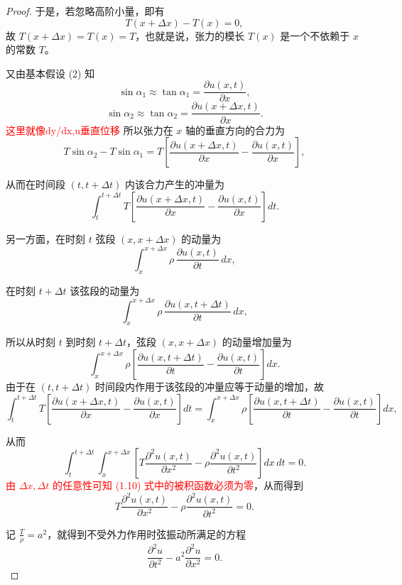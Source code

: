 \begin{proof}
于是，若忽略高阶小量，即有
\begin{equation}
  T(x+\Delta x) - T(x) = 0, \tag{1.5}
\end{equation}
故 $T(x+\Delta x) = T(x) = T$，也就是说，张力的模长 $T(x)$ 是一个不依赖于 $x$ 的常数 $T$。

又由基本假设 (2) 知
\begin{equation}
  \sin \alpha_1 \approx \tan \alpha_1 = \frac{\partial u(x,t)}{\partial x}, \tag{1.6}
\end{equation}
\begin{equation}
  \sin \alpha_2 \approx \tan \alpha_2 = \frac{\partial u(x+\Delta x,t)}{\partial x}. \tag{1.7}
\end{equation}
\textcolor{red}{这里就像dy/dx,u垂直位移}
所以张力在 $x$ 轴的垂直方向的合力为
\[
T \sin \alpha_2 - T \sin \alpha_1 
= T \left[ \frac{\partial u(x+\Delta x,t)}{\partial x} 
          - \frac{\partial u(x,t)}{\partial x} \right],
\]

从而在时间段 $(t,t+\Delta t)$ 内该合力产生的冲量为
\begin{equation}
  \int_t^{t+\Delta t} 
  T \left[ \frac{\partial u(x+\Delta x,t)}{\partial x} 
          - \frac{\partial u(x,t)}{\partial x} \right] dt. 
  \tag{1.8}
\end{equation}

另一方面，在时刻 $t$ 弦段 $(x,x+\Delta x)$ 的动量为
\[
\int_x^{x+\Delta x} \rho \, \frac{\partial u(x,t)}{\partial t} \, dx,
\]

在时刻 $t+\Delta t$ 该弦段的动量为
\[
\int_x^{x+\Delta x} \rho \, \frac{\partial u(x,t+\Delta t)}{\partial t} \, dx,
\]

所以从时刻 $t$ 到时刻 $t+\Delta t$，弦段 $(x,x+\Delta x)$ 的动量增加量为
\begin{equation}
  \int_x^{x+\Delta x} \rho \left[ 
    \frac{\partial u(x,t+\Delta t)}{\partial t} 
    - \frac{\partial u(x,t)}{\partial t} \right] dx.
  \tag{1.9}
\end{equation}
由于在 $(t, t+\Delta t)$ 时间段内作用于该弦段的冲量应等于动量的增加，故
\[
\int_t^{t+\Delta t} 
T \left[ \frac{\partial u(x+\Delta x,t)}{\partial x} 
       - \frac{\partial u(x,t)}{\partial x} \right] dt
= \int_x^{x+\Delta x} 
\rho \left[ \frac{\partial u(x,t+\Delta t)}{\partial t} 
          - \frac{\partial u(x,t)}{\partial t} \right] dx,
\]

从而
\begin{equation}
\int_t^{t+\Delta t} \int_x^{x+\Delta x} 
\left[ T \frac{\partial^2 u(x,t)}{\partial x^2} 
     - \rho \frac{\partial^2 u(x,t)}{\partial t^2} \right] dx \, dt = 0.
\tag{1.10}
\end{equation}
\textcolor{red}{
由 $\Delta x, \Delta t$ 的任意性可知 (1.10) 式中的被积函数必须为零}，从而得到
\[
T \frac{\partial^2 u(x,t)}{\partial x^2} 
- \rho \frac{\partial^2 u(x,t)}{\partial t^2} = 0.
\]

记 $\tfrac{T}{\rho} = a^2$，就得到不受外力作用时弦振动所满足的方程
\begin{equation}
\frac{\partial^2 u}{\partial t^2} 
- a^2 \frac{\partial^2 u}{\partial x^2} = 0.
\tag{1.11}
\end{equation}
\end{proof}
